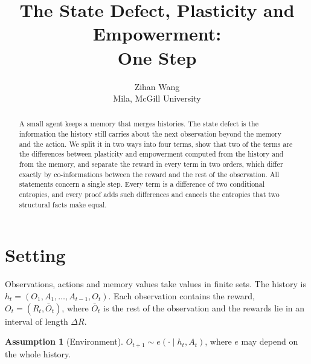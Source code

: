 \documentclass{article}
\title{The State Defect, Plasticity and Empowerment:\\ One Step}
\author{Zihan Wang\\ Mila, McGill University}
\theoremstyle{definition}
\newtheorem{assumption}{Assumption}
\theoremstyle{remark}
\newcommand{\Ob}{\bar O}
\begin{document}
\maketitle

\begin{abstract}
A small agent keeps a memory that merges histories. The state defect is the information the history still carries about the next observation beyond the memory and the action. We split it in two ways into four terms, show that two of the terms are the differences between plasticity and empowerment computed from the history and from the memory, and separate the reward in every term in two orders, which differ exactly by co-informations between the reward and the rest of the observation. All statements concern a single step. Every term is a difference of two conditional entropies, and every proof adds such differences and cancels the entropies that two structural facts make equal.
\end{abstract}

\section{Setting}

\begin{center}
\end{center}

Observations, actions and memory values take values in finite sets. The history is $h_t=(O_1,A_1,\dots,A_{t-1},O_t)$. Each observation contains the reward, $O_t=(R_t,\Ob_t)$, where $\Ob_t$ is the rest of the observation and the rewards lie in an interval of length $\Delta R$.

\begin{assumption}[Environment]\label{as:env}
$O_{t+1}\sim e(\cdot\mid h_t,A_t)$, where $e$ may depend on the whole history.
\end{assumption}
\end{document}
